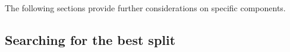 The following sections provide further considerations on specific components.

\algPredict
\algBuildTree


%

%


\subsection{Searching for the best split}
\label{sec:split search}

